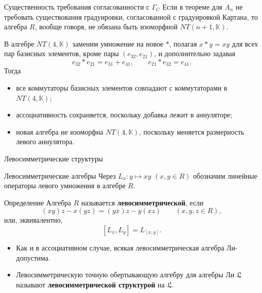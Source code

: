 \documentclass[12pt,aspectratio=169]{beamer}
\newcommand{\K}{\mathbb{K}}
\newcommand{\term}[1]{{\color{MainRed}\bfseries #1}}
\begin{document}
\begin{frame}[t]{Существенность требования согласованности с $\Gamma_C$}
    \small
    Если в теореме для $A_n$ не требовать существования градуировки, согласованной с градуировкой Картана, то алгебра $R$, вообще говоря, не обязана быть изоморфной $NT(n+1,\K)$.

    \medskip

    В алгебре $NT(4,\K)$ заменим умножение на новое $\ast$, полагая $x\ast y=xy$
    для всех пар базисных элементов, кроме пары $(e_{32},e_{21})$, и дополнительно
    задавая
    \[
        e_{32}\ast e_{21}=e_{31}+e_{41},\qquad e_{21}\ast e_{32}=e_{41}.
    \]
    Тогда
    \begin{itemize}
        \item все коммутаторы базисных элементов совпадают с коммутаторами в $NT(4,\K)$;
        \item ассоциативность сохраняется, поскольку добавка лежит в аннуляторе;
        \item новая алгебра не изоморфна $NT(4,\K)$, поскольку меняется размерность левого
              аннулятора.
    \end{itemize}
\end{frame}

\begin{frame}[plain]
    \vfill
    \begin{center}
        {Левосимметрические структуры\par}
    \end{center}
    \vfill
\end{frame}

\begin{frame}[t]{Левосимметрические алгебры}
    \small
    Через $L_x\colon y\mapsto xy$ $(x,y \in R)$ обозначим линейные операторы левого
    умножения в алгебре $R$.

    \begin{block}{Определение}
        Алгебра $R$ называется \term{левосимметрической}, если
        \[
            (xy)z-x(yz)=(yx)z-y(xz)\qquad (x,y,z\in R),
        \]
        или, эквивалентно,
        \[
            [L_x,L_y]=L_{[x,y]}.
        \]
    \end{block}

    \begin{itemize}
        \item Как и в ассоциативном случае, всякая левосимметрическая алгебра Ли-допустима.
        \item Левосимметрическую точную обертывающую алгебру для алгебры Ли $\mathfrak L$
              называют \term{левосимметрической структурой} на $\mathfrak L$.
    \end{itemize}
\end{frame}
\end{document}
